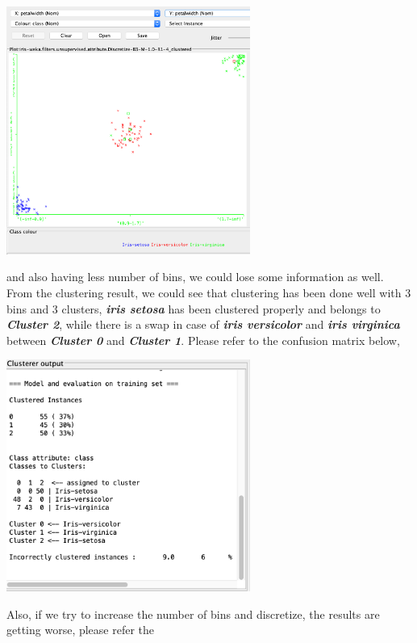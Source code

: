 \documentclass[a4paper,10pt]{article}
\begin{document}
\par
\begin{center}
  \includegraphics[width=80mm,scale=0.10]{Petal_dimension_visualization.png}
\end{center}
and also having less number of bins, we could lose some information as well.
From the clustering result, we could see that clustering has been done well with 3 bins and 3 clusters, \textbf{\textit{iris setosa}}
has been clustered properly and belongs to \textbf{\textit{Cluster 2}}, while there is a swap in case of 
\textbf{\textit{iris versicolor}} and \textbf{\textit{iris virginica}} between \textbf{\textit{Cluster 0}} and
\textbf{\textit{Cluster 1}}.  Please refer to the confusion matrix below, \par
\begin{center}
  \includegraphics[width=80mm,scale=0.10]{kmeans_clustering.png}
\end{center}
Also, if we try to increase the number of bins and discretize, the results are getting worse, please refer the 
\end{document}

